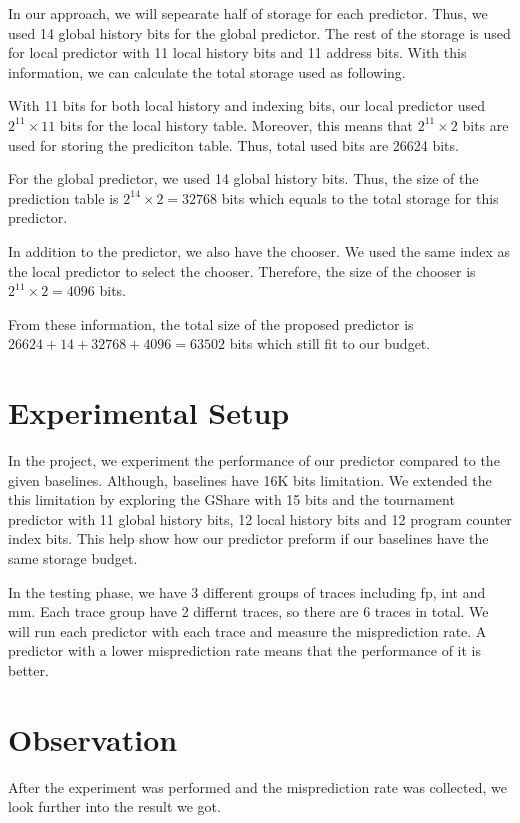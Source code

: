 \documentclass[conference]{IEEEtran}
\begin{document}
In our approach, we will sepearate half of storage for each predictor. Thus, we used 14 global
history bits for the global predictor. The rest of the storage is used for local predictor with
11 local history bits and 11 address bits. With this information, we can calculate the total
storage used as following.

With 11 bits for both local history and indexing bits, our local predictor used $2^{11} \times 11$
bits for the local history table. Moreover, this means that $2^{11} \times 2$ bits are used for
storing the prediciton table. Thus, total used bits are 26624 bits. 

For the global predictor, we used 14 global history bits. Thus, the size of the prediction
table is $2^14 \times 2 = 32768$ bits which equals to the total storage for this predictor.

In addition to the predictor, we also have the chooser. We used the same index as the local predictor
to select the chooser. Therefore, the size of the chooser is $2^11 \times 2 = 4096$ bits.

From these information, the total size of the proposed predictor is
$26624 + 14 + 32768 + 4096 = 63502$ bits which still fit to our budget.

\section{Experimental Setup}

In the project, we experiment the performance of our predictor compared to the given baselines.
Although, baselines have 16K bits limitation. We extended the this limitation
by exploring the GShare with 15 bits and the tournament predictor with
11 global history bits, 12 local history bits and 12 program counter index bits.
This help show how our predictor preform if our baselines have the same storage budget.

In the testing phase, we have 3 different groups of traces including fp, int and mm.
Each trace group have 2 differnt traces, so there are 6 traces in total. We will run
each predictor with each trace and measure the misprediction rate. A predictor with a lower misprediction rate
means that the performance of it is better.

\section{Observation}

After the experiment was performed and the misprediction rate was collected, we look
further into the result we got.
\end{document}

